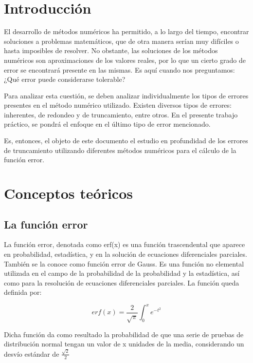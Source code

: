 \documentclass[a4paper]{article}
\begin{document}




\section{Introducción}

El desarrollo de métodos numéricos ha permitido, a lo largo del tiempo, encontrar soluciones a problemas matemáticos, que de otra manera serían muy difíciles o hasta imposibles de resolver. No obstante, las soluciones de los métodos numéricos son aproximaciones de los valores reales, por lo que un cierto grado de error se encontrará presente en las mismas. Es aquí cuando nos preguntamos: ¿Qué error puede considerarse tolerable?
    
Para analizar esta cuestión, se deben analizar individualmente los tipos de errores presentes en el método numérico utilizado. Existen diversos tipos de errores: inherentes, de redondeo y de truncamiento, entre otros. En el presente trabajo práctico, se pondrá el enfoque en el último tipo de error mencionado.
    
    Es, entonces, el objeto de este documento el estudio en profundidad de los errores de truncamiento utilizando diferentes métodos numéricos para el cálculo de la función error.

\section{Conceptos teóricos}

\subsection{La función error}

La  función error, denotada como erf(x)  es una función trascendental que aparece en probabilidad, estadística, y en la solución de ecuaciones diferenciales parciales. También se la conoce como función error de Gauss. Es una función no elemental utilizada en el campo de la probabilidad de la probabilidad y la estadística, así como para la resolución de ecuaciones diferenciales parciales. La función queda definida por:

\begin{equation}
erf(x) = \frac{2}{\sqrt{\pi}} \int_{0}^{x}{e^{-t^{2}}} 
\end{equation}

Dicha función da como resultado la probabilidad de que una serie de pruebas de distribución normal tengan un valor de x unidades de la media, considerando un desvío estándar de $\frac{\sqrt{2}}{2}$
\end{document}
